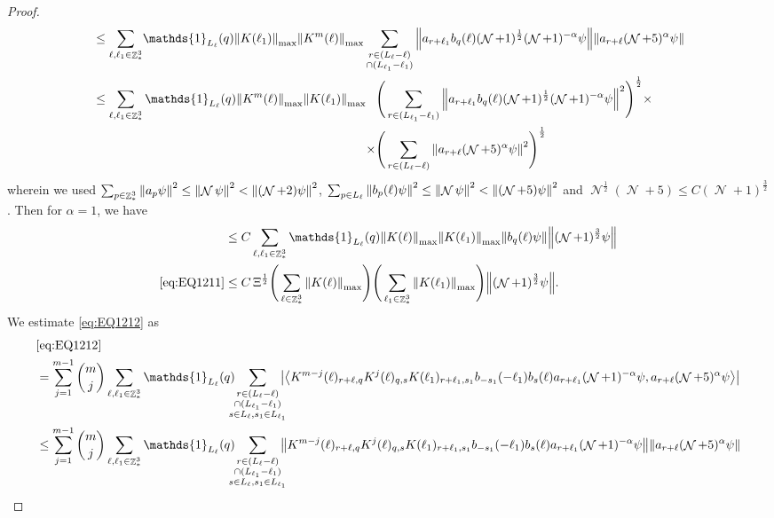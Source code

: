 \documentclass[sn-mathphys, Numbered ,a4paper]{sn-jnl}%
\DeclareMathOperator{\Z}{\mathbb{Z}}
\DeclareMathOperator{\NN}{\mathcal{N}}
\newcommand{\half}{\frac{1}{2}}
\newcommand{\eva}[1]{\left\langle #1 \right\rangle}
\theoremstyle{plain}
\theoremstyle{definition}
\theoremstyle{remark}
\theoremstyle{plain}
\theoremstyle{definition}
\theoremstyle{remark}
\begin{document}
\begin{proof}
\begin{alignat}{2}
	&\leq \sum\limits_{\ell,\ell_1 \in \Z^3_*} \!\mathds{1}_{L_\ell}(q) \norm{K(\ell_1)}_{\mathrm{max}} \norm{K^m(\ell)}_{\mathrm{max}} \sum\limits_{\substack{r \in (L_\ell-\ell) \\ \cap (L_{\ell_1}-\ell_1)}} \norm{a_{r+\ell_1} b_{q}(\ell) (\NN+1)^\half (\NN+1)^{-\alpha} \psi} \norm { a_{r+\ell} (\NN+5)^{\alpha} \psi }\nonumber\\
	&\leq \sum\limits_{\ell,\ell_1 \in \Z^3_*} \mathds{1}_{L_\ell}(q) \norm{K^{m}(\ell)}_{\mathrm{max}}\norm{K(\ell_1)}_{\mathrm{max}} \begin{aligned}[t]
	&\Bigg(\sum\limits_{r \in (L_{\ell_1}-\ell_1)} \norm{ a_{r+\ell_1} b_{q}(\ell) (\NN+1)^\half (\NN+1)^{-\alpha} \psi}^2\Bigg)^\half\times \nonumber\\\times &\Bigg( \sum\limits_{r \in (L_\ell-\ell)} \norm { a_{r+\ell} (\NN+5)^{\alpha} \psi }^2\Bigg)^\half \end{aligned}\nonumber
\end{alignat}
wherein we used $\sum_{p\in \Z^3_*}\norm{a_p \psi}^2\leq\norm{\NN\psi}^2<\norm{(\NN+2)\psi}^2$, $\sum_{p\in L_{\ell}}\norm{b_p(\ell) \psi}^2\leq\norm{\NN\psi}^2<\norm{(\NN+5)\psi}^2$ and $\NN^\half (\NN+5)\leq C(\NN+1)^{\frac{3}{2}}$. Then for $\alpha = 1$, we have
\begin{align}
	&\leq C\sum\limits_{\ell,\ell_1 \in \Z^3_*} \mathds{1}_{L_\ell}(q) \norm{K(\ell)}_{\mathrm{max}}\norm{K(\ell_1)}_{\mathrm{max}}  \norm{b_{q}(\ell) \psi} \norm { (\NN+1)^{\frac{3}{2}} \psi }\nonumber\\
	\eqref{eq:EQ1211}&\leq C \,\Xi^{\half} \Bigg(\sum\limits_{\ell \in \Z^3_*} \norm{K(\ell)}_{\mathrm{max}}\Bigg)\Bigg( \sum\limits_{\ell_1 \in \Z^3_*}\norm{K(\ell_1)}_{\mathrm{max}} \Bigg)  \norm { (\NN+1)^{\frac{3}{2}} \psi }. \label{eq:estEQ1211}
\end{align}
We estimate \eqref{eq:EQ1212} as 
\begin{alignat}{2}
	&\eqref{eq:EQ1212}\nonumber\\
	&= \sum\limits_{j=1}^{m-1} {{m}\choose j} \sum\limits_{\ell, \ell_1\in \Z^3_*} \mathds{1}_{L_{\ell}}(q)\!\!\!\! \sum\limits_{\substack{r\in (L_{\ell}-\ell)\\ \cap (L_{\ell_1}-\ell_1)\\ s \in L_{\ell},s_1\in L_{\ell_1}}}\!\!\!\! \abs{ \eva{ K^{m-j}(\ell)_{r+\ell,q} K^{j}(\ell)_{q,s} K(\ell_1)_{r+\ell_1,s_1} b_{-s_1}(-\ell_1) b_{s}(\ell) a_{r+\ell_1}(\NN+1)^{-\alpha} \psi,  a_{r+\ell}(\NN+5)^{\alpha} \psi }}\nonumber\\
	&\leq \sum\limits_{j=1}^{m-1} {{m}\choose j} \sum\limits_{\ell, \ell_1\in \Z^3_*} \mathds{1}_{L_{\ell}}(q)\!\!\!\! \sum\limits_{\substack{r\in (L_{\ell}-\ell)\\ \cap (L_{\ell_1}-\ell_1)\\ s \in L_{\ell},s_1\in L_{\ell_1}}}\!\!\!\! \norm{ K^{m-j}(\ell)_{r+\ell,q} K^{j}(\ell)_{q,s} K(\ell_1)_{r+\ell_1,s_1} b_{-s_1}(-\ell_1) b_{s}(\ell) a_{r+\ell_1}(\NN+1)^{-\alpha} \psi}\norm{  a_{r+\ell}(\NN+5)^{\alpha} \psi }\nonumber\\

\end{alignat}
\end{proof}
\end{document}

